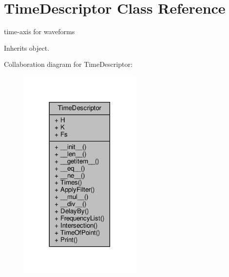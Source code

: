 \hypertarget{classSignalIntegrity_1_1TimeDomain_1_1Waveform_1_1TimeDescriptor_1_1TimeDescriptor}{}\section{Time\+Descriptor Class Reference}
\label{classSignalIntegrity_1_1TimeDomain_1_1Waveform_1_1TimeDescriptor_1_1TimeDescriptor}


time-\/axis for waveforms  




Inherits object.



Collaboration diagram for Time\+Descriptor\+:\nopagebreak
\begin{figure}[H]
\begin{center}
\leavevmode
\includegraphics[width=173pt]{classSignalIntegrity_1_1TimeDomain_1_1Waveform_1_1TimeDescriptor_1_1TimeDescriptor__coll__graph}
\end{center}
\end{figure}
